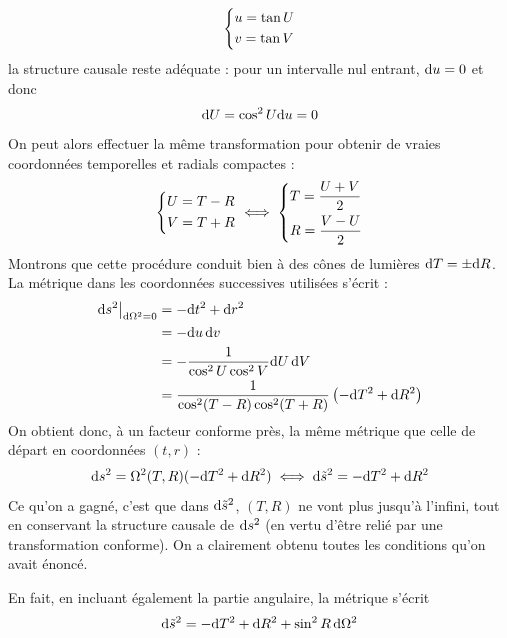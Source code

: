 {\begin{align}
    \begin{dcases}
        u = \tan U\\
        v = \tan V
    \end{dcases}
\end{align}
la structure causale reste adéquate : pour un intervalle nul entrant, $\mathrm{d} u = 0$ et donc 
\begin{align}
    \mathrm{d} U = \cos^2 U \mathrm{d} u = 0
\end{align}
On peut alors effectuer la même transformation pour obtenir de vraies coordonnées temporelles et radials compactes :
\begin{align}
    \begin{dcases}
        U = T -R\\
        V = T + R
    \end{dcases} \iff \begin{dcases}
        T = \frac{U+V}{2}\\
        R = \frac{V - U}{2}
    \end{dcases}
\end{align}
Montrons que cette procédure conduit bien à des cônes de lumières $\mathrm{d} T = \pm \mathrm{d} R$. La métrique dans les coordonnées successives utilisées s'écrit :
\begin{align}
    \mathrm{d} s^2 \big|_{\mathrm{d} \Omega^2=0} &= - \mathrm{d} t^2 +\mathrm{d} r^2\\
    &= - \mathrm{d} u \, \mathrm{d} v \\
    & = - \frac{1}{\cos^2U \cos^2V} \mathrm{d} U\, \mathrm{d} V\\
    & = \frac{1}{\cos^2(T-R) \cos^2(T+R)} \left( - \mathrm{d} T^2 + \mathrm{d} R^2 \right)
\end{align}
On obtient donc, à un facteur conforme près, la même métrique que celle de départ en coordonnées $(t,r)$ :
\begin{align}
    \label{ref:mink conforme}
    \mathrm{d} s^2 = \Omega^2(T,R) (- \mathrm{d} T^2+ \mathrm{d} R^2) \iff \mathrm{d} \tilde{s}^2 = - \mathrm{d} T^2+\mathrm{d} R^2
\end{align}
Ce qu'on a gagné, c'est que dans $\mathrm{d} \tilde{s}^2$, $(T,R)$ ne vont plus jusqu'à l'infini, tout en conservant la structure causale de $\mathrm{d} s^2$ (en vertu d'être relié par une transformation conforme). On a clairement obtenu toutes les conditions qu'on avait énoncé. 
\begin{rmk}
    En fait, en incluant également la partie angulaire, la métrique s'écrit 
    \begin{align}
        \td \tilde{s}^2 = -\td T^2+\td R^2 + \sin^2 R \,\td \Omega^2

\end{align}
\end{rmk}}
